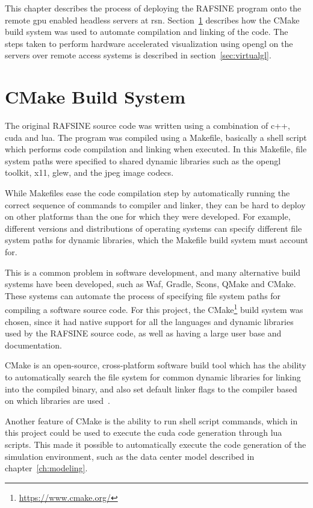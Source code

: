 This chapter describes the process of deploying the RAFSINE program onto the remote \gls{gpu} enabled headless servers at \gls{rsn}. Section~\ref{sec:cmake} describes how the CMake build system was used to automate compilation and linking of the code. The steps taken to perform hardware accelerated visualization using \gls{opengl} on the servers over remote access systems is described in section~\ref{sec:virtualgl}.  

\section{CMake Build System}\label{sec:cmake}
The original RAFSINE source code was written using a combination of \gls{c++}, \gls{cuda} and \gls{lua}. The program was compiled using a Makefile, basically a shell script which performs code compilation and linking when executed. In this Makefile, file system paths were specified to shared dynamic libraries such as the \gls{opengl} toolkit, \gls{x11}, \gls{glew}, and the \gls{jpeg} image codecs. 

While Makefiles ease the code compilation step by automatically running the correct sequence of commands to compiler and linker, they can be hard to deploy on other platforms than the one for which they were developed. For example, different versions and distributions of operating systems can specify different file system paths for dynamic libraries, which the Makefile build system must account for.

This is a common problem in software development, and many alternative build systems have been developed, such as Waf, Gradle, Scons, QMake and CMake. These systems can automate the process of specifying file system paths for compiling a software source code. For this project, the CMake\footnote{\url{https://www.cmake.org/}} build system was chosen, since it had native support for all the languages and dynamic libraries used by the RAFSINE source code, as well as having a large user base and documentation.

CMake is an open-source, cross-platform software build tool which has the ability to automatically search the file system for common dynamic libraries for linking into the compiled binary, and also set default linker flags to the compiler based on which libraries are used~\cite{cmake}.

Another feature of CMake is the ability to run shell script commands, which in this project could be used to execute the \gls{cuda} code generation through \gls{lua} scripts. This made it possible to automatically execute the code generation of the simulation environment, such as the data center model described in chapter~\ref{ch:modeling}.

